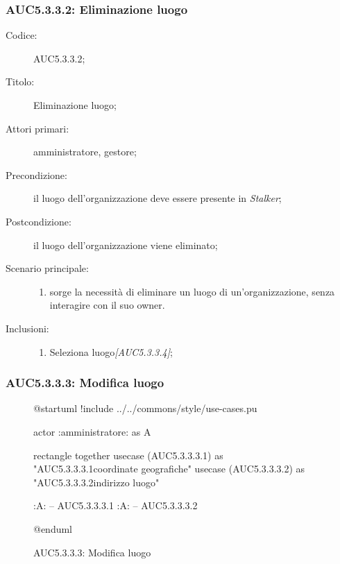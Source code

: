 \documentclass[../../../analisi-dei-requisiti.tex]{subfiles}
\begin{document}
\subsubsection{AUC5.3.3.2: Eliminazione luogo}%
\label{subs:AUC5.3.3.2}
\begin{description}
  \item[Codice:] AUC5.3.3.2;
  \item[Titolo:] Eliminazione luogo;
  \item[Attori primari:] amministratore, gestore;
  \item[Precondizione:] il luogo dell'organizzazione deve essere presente in \emph{Stalker};
  \item[Postcondizione:] il luogo dell'organizzazione viene eliminato;
  \item[Scenario principale:]
  \begin{enumerate}
    \item sorge la necessità di eliminare un luogo di un'organizzazione, senza interagire con il suo owner.
  \end{enumerate}
  \item[Inclusioni:]
  \begin{enumerate}
    \item Seleziona luogo\emph{[AUC5.3.3.4]};
  \end{enumerate}
\end{description}

\subsubsection{AUC5.3.3.3: Modifica luogo}%
\label{subs:AUC5.3.3.3}

\begin{figure}[H]
  \centering
  \begin{plantuml}
  @startuml
  !include ../../commons/style/use-cases.pu

  actor :amministratore: as A

  rectangle {
    together {
      usecase (AUC5.3.3.3.1) as "AUC5.3.3.3.1\nModifica coordinate geografiche"
      usecase (AUC5.3.3.3.2) as "AUC5.3.3.3.2\nModifica indirizzo luogo"
    }
  }

  :A: -- AUC5.3.3.3.1
  :A: -- AUC5.3.3.3.2

  @enduml
  \end{plantuml}
  \caption{AUC5.3.3.3: Modifica luogo}%
  \label{fig:AUC5_3_3_3}
\end{figure}
\end{document}
